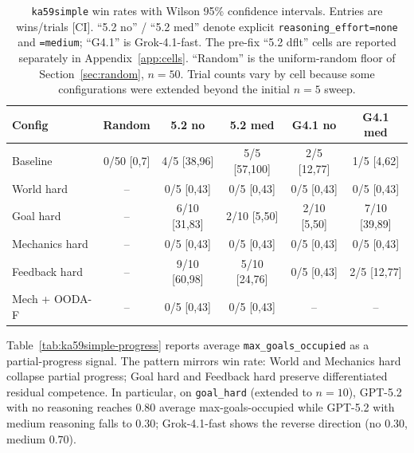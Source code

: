 \documentclass{article}
\begin{document}
\begin{table}[t]
  \small
  \setlength{\tabcolsep}{4pt}
  \caption{\texttt{ka59simple} win rates with Wilson 95\% confidence intervals. Entries are wins/trials [CI]. ``5.2 no'' / ``5.2 med'' denote explicit \texttt{reasoning\_effort=none} and \texttt{=medium}; ``G4.1'' is Grok-4.1-fast. The pre-fix ``5.2 dflt'' cells are reported separately in Appendix~\ref{app:cells}. ``Random'' is the uniform-random floor of Section~\ref{sec:random}, $n=50$. Trial counts vary by cell because some configurations were extended beyond the initial $n=5$ sweep.}
  \label{tab:ka59simple-wins}
  \centering
  \begin{tabular}{lccccc}
    \toprule
    Config & Random & 5.2 no & 5.2 med & G4.1 no & G4.1 med \\
    \midrule
    Baseline       & 0/50 [0,7] & 4/5 [38,96]  & 5/5 [57,100] & 2/5 [12,77] & 1/5 [4,62] \\
    World hard     & --         & 0/5 [0,43]   & 0/5 [0,43]   & 0/5 [0,43]  & 0/5 [0,43] \\
    Goal hard      & --         & 6/10 [31,83] & 2/10 [5,50]  & 2/10 [5,50] & 7/10 [39,89] \\
    Mechanics hard & --         & 0/5 [0,43]   & 0/5 [0,43]   & 0/5 [0,43]  & 0/5 [0,43] \\
    Feedback hard  & --         & 9/10 [60,98] & 5/10 [24,76] & 0/5 [0,43]  & 2/5 [12,77] \\
    Mech + OODA-F  & --         & 0/5 [0,43]   & 0/5 [0,43]   & --          & -- \\
    \bottomrule
  \end{tabular}
\end{table}

Table~\ref{tab:ka59simple-progress} reports average \texttt{max\_goals\_occupied} as a partial-progress signal. The pattern mirrors win rate: World and Mechanics hard collapse partial progress; Goal hard and Feedback hard preserve differentiated residual competence. In particular, on \texttt{goal\_hard} (extended to $n=10$), GPT-5.2 with no reasoning reaches $0.80$ average max-goals-occupied while GPT-5.2 with medium reasoning falls to $0.30$; Grok-4.1-fast shows the reverse direction (no $0.30$, medium $0.70$).
\end{document}
